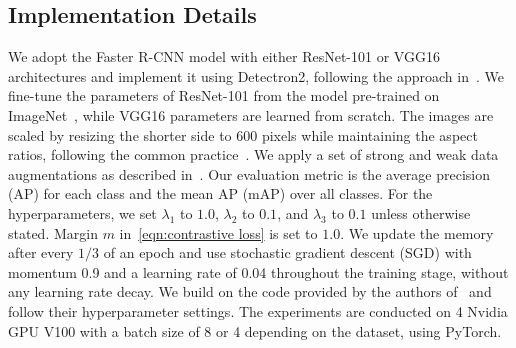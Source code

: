 \documentclass{bmvc2k}
\begin{document}
\subsection{Implementation Details}\label{sec:implementation_details}
We adopt the Faster R-CNN model with either ResNet-101 or VGG16 architectures and implement it using Detectron2, following the approach in~\cite{saito2019strong, xu2020cross, tian2021knowledge, li2022cross}. We fine-tune the parameters of ResNet-101 from the model pre-trained on ImageNet~\cite{deng2009imagenet}, while VGG16 parameters are learned from scratch. The images are scaled by resizing the shorter side to 600 pixels while maintaining the aspect ratios, following the common practice~\cite{he2019multi}. We apply a set of strong and weak data augmentations as described in~\cite{li2022cross}. Our evaluation metric is the average precision (AP) for each class and the mean AP (mAP) over all classes.
For the hyperparameters, we set $\lambda_1$ to $1.0$, $\lambda_2$ to $0.1$, and $\lambda_3$ to $0.1$ unless otherwise stated. Margin $m$ in~\cref{eqn:contrastive loss} is set to $1.0$. We update the memory after every $1/3$ of an epoch and use stochastic gradient descent (SGD) with momentum 0.9 and a learning rate of 0.04 throughout the training stage, without any learning rate decay. We build on the code provided by the authors of~\cite{li2022cross} and follow their hyperparameter settings. The experiments are conducted on 4 Nvidia GPU V100 with a batch size of 8 or 4 depending on the dataset, using PyTorch.
\end{document}
